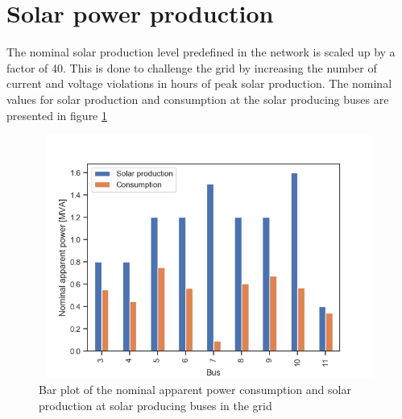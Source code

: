\documentclass[class=book, crop=false]{standalone}
\begin{document}
\section{Solar power production}
The nominal solar production level predefined in the network is scaled up by a factor of 40. This is done to challenge the grid by increasing the number of current and voltage violations in hours of peak solar production. The nominal values for solar production and consumption at the solar producing buses are presented in figure \ref{fig:discussion:nominal_sgen}


\begin{figure}[h]
    \center
\includegraphics[height=8cm, width=12cm]{figures/nominal_sgen.png}
    \caption[size = 9]{Bar plot of the nominal apparent power consumption and solar production at solar producing buses in the grid}
    \label{fig:discussion:nominal_sgen}
\end{figure}
\end{document}
